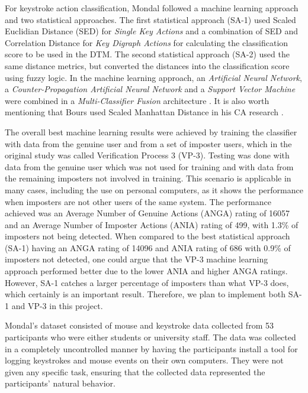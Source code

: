 \documentclass[informationsecurity]{gucmasterproject}
\begin{document}
For keystroke action classification, Mondal followed a machine learning approach and two statistical approaches.
The first statistical approach (SA-1) used Scaled Euclidian Distance (SED) for \textit{Single Key Actions} and a combination of SED and Correlation Distance for \textit{Key Digraph Actions} for calculating the classification score to be used in the DTM. 
The second statistical approach (SA-2) used the same distance metrics, but converted the distances into the classification score using fuzzy logic.
In the machine learning approach, an \textit{Artificial Neural Network}, a \textit{Counter-Propagation Artificial Neural Network} and a \textit{Support Vector Machine} were combined in a \textit{Multi-Classifier Fusion} architecture \cite{mondal}. It is also worth mentioning that Bours used Scaled Manhattan Distance in his CA research \cite{BOURS201236}.

The overall best machine learning results were achieved by training the classifier with data from the genuine user and from a set of imposter users, which in the original study \cite{mondal} was called Verification Process 3 (VP-3).
Testing was done with data from the genuine user which was not used for training and with data from the remaining imposters not involved in training.
This scenario is applicable in many cases, including the use on personal computers, as it shows the performance when imposters are not other users of the same system.
The performance achieved was an Average Number of Genuine Actions (ANGA) rating of 16057 and an Average Number of Imposter Actions (ANIA) rating of 499, with 1.3\% of imposters not being detected.
When compared to the best statistical approach (SA-1) having an ANGA rating of 14096 and ANIA rating of 686 with 0.9\% of imposters not detected, one could argue that the VP-3 machine learning approach performed better due to the lower ANIA and higher ANGA ratings.
However, SA-1 catches a larger percentage of imposters than what VP-3 does, which certainly is an important result.
Therefore, we plan to implement both SA-1 and VP-3 in this project.

Mondal's \cite{mondal} dataset consisted of mouse and keystroke data collected from 53 participants who were either students or university staff.
The data was collected in a completely uncontrolled manner by having the participants install a tool for logging keystrokes and mouse events on their own computers.
They were not given any specific task, ensuring that the collected data represented the participants' natural behavior.
\end{document}
